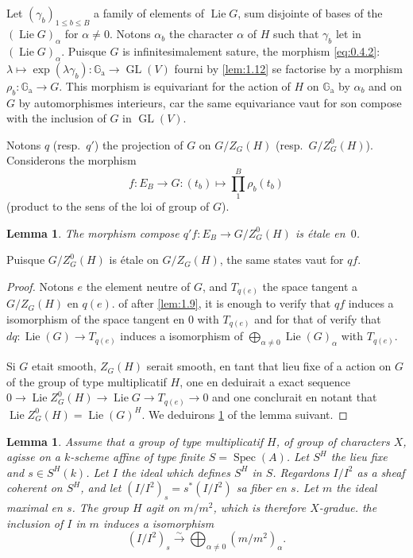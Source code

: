 \documentclass[11pt,a4paper]{article}
\theoremstyle{plain}
\newtheorem{lemma}[theorem]{Lemma}
\theoremstyle{definition}
\DeclareMathOperator{\Spec}{Spec}
\DeclareMathOperator{\Lie}{Lie}
\DeclareMathOperator{\GL}{GL}
\newcommand{\Ga}{\mathbb{G}_\mathrm{a}}
\begin{document}
\subsection{}
Let $(\gamma_b)_{1 \leq b \leq B}$ a family of elements of $\Lie G$, sum disjointe of bases of the $(\Lie G)_\alpha$ for $\alpha \neq 0$. Notons $\alpha_b$ the character $\alpha$ of $H$ such that $\gamma_b$ let in $(\Lie G)_\alpha$. Puisque $G$ is infinitesimalement sature, the morphism \ref{eq:0.4.2}: $\lambda \mapsto \exp(\lambda\gamma_b): \Ga \to \GL(V)$ fourni by \ref{lem:1.12} se factorise by a morphism $\rho_b: \Ga \longrightarrow G$. This morphism is equivariant for the action of $H$ on $\Ga$ by $\alpha_b$ and on $G$ by automorphismes interieurs, car the same equivariance vaut for son compose with the inclusion of $G$ in $\GL(V)$.

Notons $q$ (resp.~$q'$) the projection of $G$ on $G/Z_G(H)$ (resp.~$G/Z^0_G(H)$). Considerons the morphism
\[
f: E_B \longrightarrow G: (t_b) \longmapsto \prod_{1}^{B} \rho_b(t_b)
\]
(product to the sens of the loi of group of $G$).

\begin{lemma}\label{lem:1.14}
The morphism compose $q'f: E_B \to G/Z^0_G(H)$ is étale en~$0$.
\end{lemma}

Puisque $G/Z^0_G(H)$ is étale on $G/Z_G(H)$, the same states vaut for $qf$.

\begin{proof}
Notons $e$ the element neutre of $G$, and $T_{q(e)}$ the space tangent a $G/Z_G(H)$ en $q(e)$. of after \ref{lem:1.9}, it is enough to verify that $qf$ induces a isomorphism of the space tangent en $0$ with $T_{q(e)}$ and for that of verify that $dq: \Lie(G) \to T_{q(e)}$ induces a isomorphism of $\bigoplus_{\alpha \neq 0} \Lie(G)_\alpha$ with $T_{q(e)}$.

Si $G$ etait smooth, $Z_G(H)$ serait smooth, en tant that lieu fixe of a action on $G$ of the group of type multiplicatif $H$, one en deduirait a exact sequence $0 \to \Lie Z^0_G(H) \to \Lie G \to T_{q(e)} \to 0$ and one conclurait en notant that $\Lie Z^0_G(H) = \Lie(G)^H$. We deduirons \ref{lem:1.14} of the lemma suivant.
\end{proof}

\begin{lemma}\label{lem:1.15}
Assume that a group of type multiplicatif $H$, of group of characters $X$, agisse on a $k$-scheme affine of type finite $S = \Spec(A)$. Let $S^H$ the lieu fixe and $s \in S^H(k)$. Let $I$ the ideal which defines $S^H$ in $S$. Regardons $I/I^2$ as a sheaf coherent on $S^H$, and let $(I/I^2)_s = s^*(I/I^2)$ sa fiber en $s$. Let $m$ the ideal maximal en $s$. The group $H$ agit on $m/m^2$, which is therefore $X$-gradue. the inclusion of $I$ in $m$ induces a isomorphism
\begin{equation}\label{eq:1.15.1}
(I/I^2)_s \xrightarrow{\sim} \bigoplus_{\alpha \neq 0} (m/m^2)_\alpha.
\end{equation}
\end{lemma}
\end{document}
